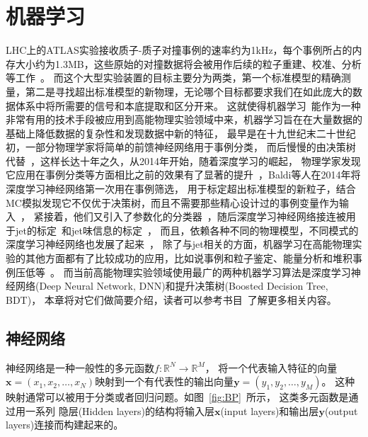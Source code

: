 
\chapter{机器学习}
\label{cha:ML}

LHC上的ATLAS实验接收质子-质子对撞事例的速率约为1kHz，每个事例所占的内存大小约为1.3MB，这些原始的对撞数据将会被用作后续的粒子重建、校准、分析等工作~\cite{PERF-2007-01}。
而这个大型实验装置的目标主要分为两类，第一个标准模型的精确测量，第二是寻找超出标准模型的新物理，无论哪个目标都要求我们在如此庞大的数据体系中将所需要的信号和本底提取和区分开来。
这就使得机器学习~\cite{RevModPhys.91.045002}能作为一种非常有用的技术手段被应用到高能物理实验领域中来，机器学习旨在在大量数据的基础上降低数据的复杂性和发现数据中新的特征，
最早是在十九世纪末二十世纪初，一部分物理学家将简单的前馈神经网络用于事例分类，
而后慢慢的由决策树代替~\cite{JNN62,JNN63,JNN64}，这样长达十年之久，从2014年开始，随着深度学习的崛起，
物理学家发现它应用在事例分类等方面相比之前的效果有了显著的提升~\cite{JNN65,JNN66}，Baldi等人在2014年将深度学习神经网络第一次用在事例筛选，
用于标定超出标准模型的新粒子，结合MC模拟发现它不仅优于决策树，而且不需要那些精心设计过的事例变量作为输入~\cite{JNN67}，
紧接着，他们又引入了参数化的分类器~\cite{JNN68}，随后深度学习神经网络接连被用于jet的标定~\cite{JNN69,JNN70,JNN71}和jet味信息的标定~\cite{JNN72}，
而且，依赖各种不同的物理模型，不同模式的深度学习神经网络也发展了起来~\cite{JNN73,JNN74,JNN75,JNN76}，
除了与jet相关的方面，机器学习在高能物理实验的其他方面都有了比较成功的应用，比如说事例和粒子鉴定、能量分析和堆积事例压低等~\cite{Albertsson_2018}。
而当前高能物理实验领域使用最广的两种机器学习算法是深度学习神经网络(Deep Neural Network, DNN)和提升决策树(Boosted Decision Tree, BDT)，
本章将对它们做简要介绍，读者可以参考书目~\cite{MLTsinghua,MLMIT}了解更多相关内容。


\section{神经网络}
\label{sec:NN}

神经网络是一种一般性的多元函数$f:	\mathbb{R}^N\rightarrow\mathbb{R}^M$，
将一个代表输入特征的向量$\boldsymbol{x}=(x_1,x_2,	\dots,x_N)$映射到一个有代表性的输出向量$\boldsymbol{y}=(y_1,y_2,	\dots,y_M)$。
这种映射通常可以被用于分类或者回归问题。如图~\ref{fig:BP}~所示，
这类多元函数是通过用一系列
隐层(Hidden layers)的结构将输入层$\boldsymbol{x}$(input layers)和输出层$\boldsymbol{y}$(output layers)连接而构建起来的。


